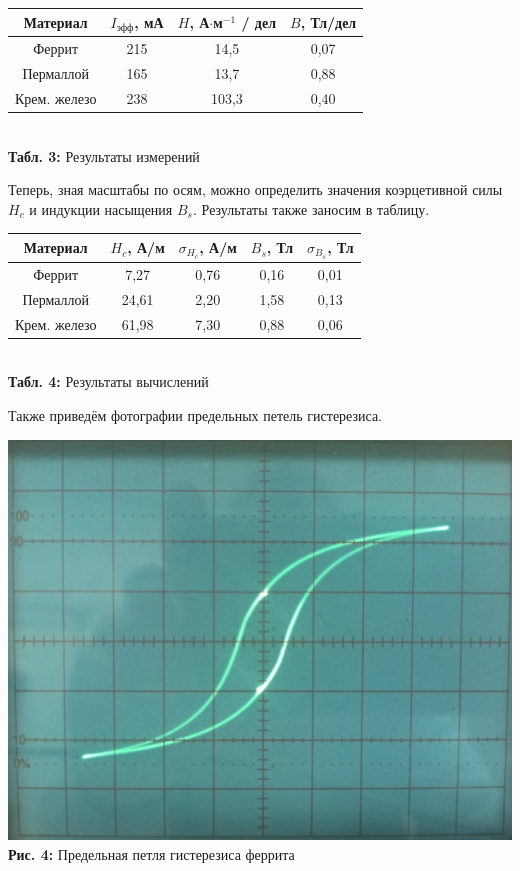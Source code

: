 \documentclass[12pt,a4paper]{scrartcl}
\begin{document}
	\begin{center}
	\begin{tabular}{|c|c|c|c|}
		\hline
		Материал     & $I_\text{эфф}$, мА & $H$, А$\cdot$м$^{-1}$ / дел & $B$, Тл/дел \\ \hline
		Феррит       & 215                & 14,5                        & 0,07        \\ \hline
		Пермаллой    & 165                & 13,7                        & 0,88        \\ \hline
		Крем. железо & 238                & 103,3                       & 0,40        \\ \hline
	\end{tabular}
	\\\textbf{Табл. 3:} Результаты измерений
\end{center}
	
Теперь, зная масштабы по осям, можно определить значения коэрцетивной силы $ H_c $
и индукции насыщения $ B_s $. Результаты также заносим в таблицу.

\begin{center}
	\begin{tabular}{|c|c|c|c|c|}
		\hline
		Материал     & $H_c$, А/м & $\sigma_{H_c}$, А/м & $B_s$, Тл & $\sigma_{B_s}$, Тл \\ \hline
		Феррит       & 7,27       & 0,76                & 0,16      & 0,01               \\ \hline
		Пермаллой    & 24,61      & 2,20                & 1,58      & 0,13               \\ \hline
		Крем. железо & 61,98      & 7,30                & 0,88      & 0,06               \\ \hline
	\end{tabular}
	\\\textbf{Табл. 4:} Результаты вычислений
\end{center}
	
Также приведём фотографии предельных петель гистерезиса.

	\begin{center}
		\includegraphics[scale=0.5]{PIC_4.jpg}
		\\\textbf{Рис. 4: } Предельная петля гистерезиса феррита
	\end{center}
	
\end{document}
